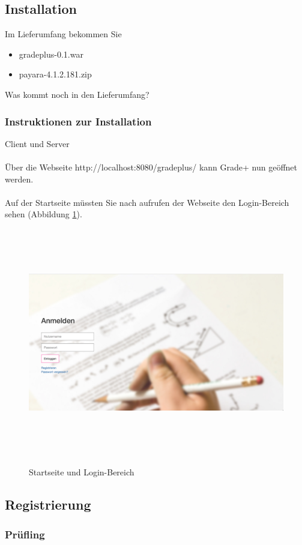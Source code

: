 \subsection{Installation}
Im Lieferumfang bekommen Sie
\begin{itemize}  
\item gradeplus-0.1.war
\item payara-4.1.2.181.zip
\end{itemize}
Was kommt noch in den Lieferumfang?
\subsubsection{Instruktionen zur Installation}
Client und Server\\
\\
Über die Webseite http://localhost:8080/gradeplus/ kann Grade+ nun geöffnet werden.\\
\\
Auf der Startseite müssten Sie nach aufrufen der Webseite den Login-Bereich sehen (Abbildung \ref{fig 1}).
\begin{figure}[H]
	\centering
	\caption{Startseite und Login-Bereich}
  \includegraphics[width=\textwidth,height=10cm,keepaspectratio]{../screenshots/startseite.png}
	\label{fig 1}
\end{figure}

\subsection{Registrierung}
\label{sec:regristrierung}
\subsubsection{Prüfling} 

